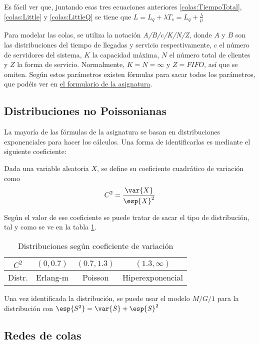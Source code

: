 Es fácil ver que, juntando esas tres ecuaciones anteriores \eqref{colas:TiempoTotal}, \eqref{colas:Little} y \eqref{colas:LittleQ} se tiene que \( L = L_q + λT_s = L_q + \frac{λ}{μ} \)

Para modelar las colas, se utiliza la notación \textit{A/B/c/K/N/Z}, donde $A$ y $B$ son las distribuciones del tiempo de llegadas y servicio respectivamente, $c$ el número de servidores del sistema, $K$ la capacidad máxima, $N$ el número total de clientes y $Z$ la forma de servicio. Normalmente, $K = N = ∞$ y $Z = FIFO$, así que se omiten. Según estos parámetros existen fórmulas para sacar todos los parámetros, que podéis ver en \href{https://moodle.uam.es/pluginfile.php/372658/mod_resource/content/1/si2t2-formulas.pdf}{el formulario de la asignatura}.

\subsection{Distribuciones no Poissonianas}

La mayoría de las fórmulas de la asignatura se basan en distribuciones exponenciales para hacer los cálculos. Una forma de identificarlas es mediante el siguiente coeficiente:

\begin{defn} Dada una variable aleatoria $X$, se define su coeficiente cuadrático de variación como \[ C^2 = \frac{\var{X}}{\esp{X}^2}\]
\end{defn}

Según el valor de ese coeficiente se puede tratar de sacar el tipo de distribución, tal y como se ve en la tabla \ref{colas:TablaCoefsCuadr}.

\begin{table}[hbtp]
\centering
\begin{tabular}{c|ccc}
$C^2$  & $(0, 0.7)$ & $(0.7, 1.3)$ & $(1.3, ∞)$ \\ \hline
Distr. & Erlang-m & Poisson & Hiperexponencial
\end{tabular}
\caption{Distribuciones según coeficiente de variación}
\label{colas:TablaCoefsCuadr}
\end{table}

Una vez identificada la distribución, se puede usar el modelo $M/G/1$ para la distribución con \( \esp{S^2} = \var{S} + \esp{S}^2 \)

\subsection{Redes de colas}

